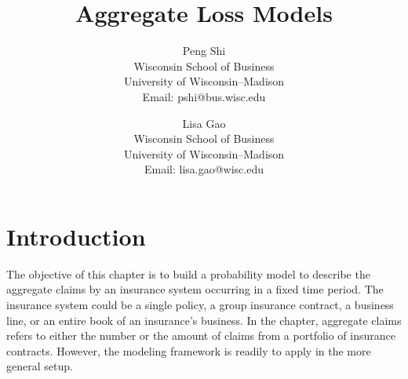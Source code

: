 \documentclass[12pt,letterpaper]{article}
\begin{document}
\title{Aggregate Loss Models}

\author{
    Peng Shi \\
    Wisconsin School of Business\\
    University of Wisconsin--Madison\\
    Email: pshi@bus.wisc.edu\\
    \and
    Lisa Gao \\
    Wisconsin School of Business\\
    University of Wisconsin--Madison\\
    Email: lisa.gao@wisc.edu\\
}
\maketitle


 \tableofcontents



\section{Introduction}

The objective of this chapter is to build a probability model to describe the aggregate claims by an insurance system occurring in a fixed time period. The insurance system could be a single policy, a group insurance contract, a business line, or an entire book of an insurance's business. In the chapter, aggregate claims refers to either the number or the amount of claims from a portfolio of insurance contracts. However, the modeling framework is readily to apply in the more general setup.
\end{document}
